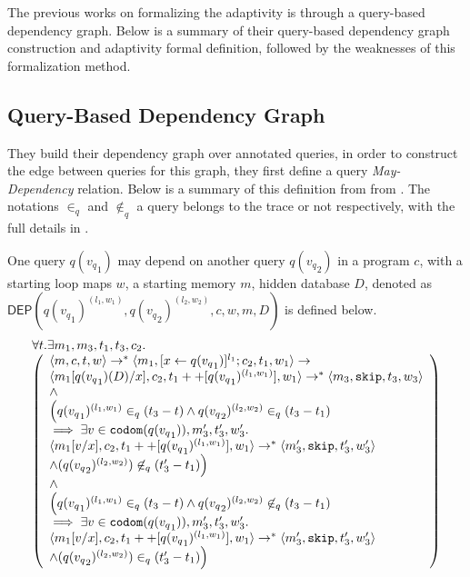 The previous works on formalizing the adaptivity is through a query-based dependency graph.
Below is a summary of their query-based dependency graph construction and adaptivity formal definition, followed
by the weaknesses of this formalization method.
\subsection*{Query-Based Dependency Graph}
They build their dependency graph over annotated queries, in order to construct the edge between queries for this graph, they first
define a query \emph{May-Dependency} relation. Below is a summary of this definition from
from .
The notations $\in_q$ and $\not\in_q$ a query belongs to the trace or not respectively, with the full details in .
\begin{defn}
One query $q({v_q}_1)$ may depend on another query $q({v_q}_2)$ in a program $c$, with a starting loop maps $w$, a starting memory $m$, hidden database $D$, denoted as \\
$\mathsf{DEP}(q({v_q}_1)^{(l_1, w_1)}, q({v_q}_2)^{(l_2, w_2)}, c,w, m, D)$ is defined below. 
\[
\begin{array}{l}
\forall  t. \exists m_1,m_3,t_1,t_3,c_2.\\
  \left (\begin{array}{l}   
\config{m, c,  t,w} \rightarrow^{*} \config{m_1, [\assign{x}{q({v_q}_1)}]^{l_1} ; c_2,
  t_1,w_1} \rightarrow \\ \config{m_1[q({v_q}_1)(D)/x], c_2,
  t_1++[q({v_q}_1)^{(l_1, w_1)}], w_1} \rightarrow^{*} \config{m_3, \eskip,
  t_3,w_3} \\  
  \land \\
\Big( q({v_q}_1)^{(l_1,w_1)} \in_{q} (t_3-t) \land q({v_q}_2)^{(l_2,w_2)} \in_{q} (t_3-t_1) \\ \implies  \exists v \in \codom(q({v_q}_1)), m_3', t_3', w_3'.  \\
 \config{m_1[v/x], {c_2}, t_1++[q({v_q}_1)^{(l_1,w_1)}], w_1} \rightarrow^{*} \config{m_3', \eskip, t_3', w_3'} \\ \land (q({v_q}_2)^{(l_2,w_2)}) \not \in_{q} (t_3'-t_1)
\Big)\\
\land \\
\Big(q({v_q}_1)^{(l_1,w_1)} \in_{q} (t_3-t) \land q({v_q}_2)^{(l_2,w_2)} \not\in_{q} (t_3-t_1) \\ \implies  \exists v \in \codom(q({v_q}_1)),  m_3', t_3', w_3'. \\
 \config{m_1[v/x], {c_2}, t_1++[q({v_q}_1)^{(l_1,w_1)}], w_1} \rightarrow^{*} \config{m_3', \eskip, t_3', w_3'} \\ \land (q({v_q}_2)^{(l_2,w_2)})  \in_{q} (t_3'-t_1)
\Big)
\end{array} \right )
\end{array}
\]
\end{defn}
